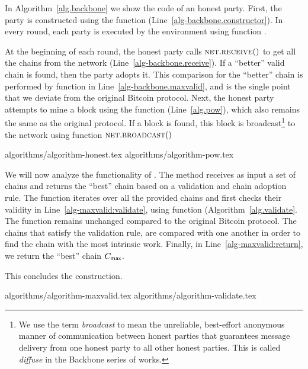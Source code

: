 In Algorithm~\ref{alg.backbone} we show the code of an honest party.
First, the party is constructed using the \constructor function (Line~\ref{alg-backbone.constructor}).
In every round, each party is executed by the environment using function \execute.

At the beginning of each round, the honest party calls $\textsc{net}.\textsc{receive}()$ to get all
the chains from the network (Line~\ref{alg-backbone.receive}). If a ``better''
valid chain is found, then the party adopts it.
This comparison for the ``better'' chain is performed by
function \maxvalid in Line~\ref{alg-backbone.maxvalid}, and
is the single point that we deviate from the original Bitcoin protocol.
Next, the honest party attempts to mine a block using the \pow function (Line~\ref{alg.pow}),
which also remains the same as the original protocol.
If a block is found, this block is broadcast\footnote{We use the term \emph{broadcast}
to mean the unreliable, best-effort anonymous manner of communication between honest parties that
guarantees message delivery from one honest party to all other honest parties.
This is called \emph{diffuse} in the Backbone series of works.}
to the network using function $\textsc{net}.\textsc{broadcast}()$

{algorithms/algorithm-honest.tex}
{algorithms/algorithm-pow.tex}

We will now analyze the functionality of \maxvalid. The method receives as input
a set of chains and returns the ``best'' chain based on a validation and
chain adoption rule. The function iterates over all the provided chains
and first checks their validity in Line~\ref{alg-maxvalid:validate}, using
function \validate (Algorithm~\ref{alg.validate}. The \validate function remains unchanged compared to
the original Bitcoin protocol.
The chains that satisfy the validation rule,
are compared with one another in order to find the chain
with the most intrinsic work. Finally, in Line~\ref{alg-maxvalid:return}, we return the
``best'' chain $C_{\textsf{max}}$.

This concludes the \poem construction.

{algorithms/algorithm-maxvalid.tex}
{algorithms/algorithm-validate.tex}



